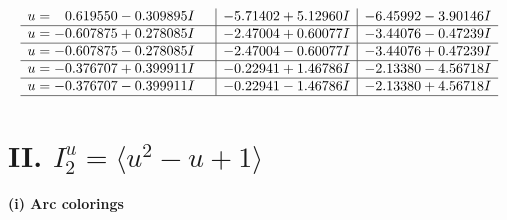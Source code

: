 \documentclass[1p]{elsarticle_modified}
\theoremstyle{definition}
\begin{document}
$$\begin{array}{c|c|c}
\begin{aligned}
u &= \phantom{-}0.619550 - 0.309895 I\end{aligned}
 & -5.71402 + 5.12960 I & -6.45992 - 3.90146 I \\ \hline\begin{aligned}
u &= -0.607875 + 0.278085 I\end{aligned}
 & -2.47004 + 0.60077 I & -3.44076 - 0.47239 I \\ \hline\begin{aligned}
u &= -0.607875 - 0.278085 I\end{aligned}
 & -2.47004 - 0.60077 I & -3.44076 + 0.47239 I \\ \hline\begin{aligned}
u &= -0.376707 + 0.399911 I\end{aligned}
 & -0.22941 + 1.46786 I & -2.13380 - 4.56718 I \\ \hline\begin{aligned}
u &= -0.376707 - 0.399911 I\end{aligned}
 & -0.22941 - 1.46786 I & -2.13380 + 4.56718 I\\
 \hline 
 \end{array}$$\newpage\newpage\renewcommand{\arraystretch}{1}
\centering \section*{II. $I^u_{2}= \langle u^2- u+1 \rangle$}
\flushleft \textbf{(i) Arc colorings}\\
\end{document}
